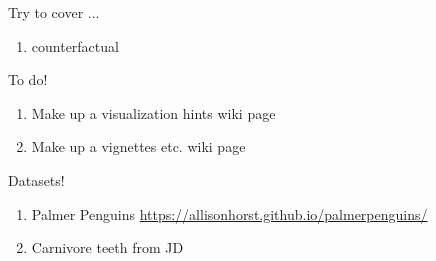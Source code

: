 \documentclass[11pt]{article}
\begin{document}

\renewcommand{\refname}{\CHead{}}

Try to cover ...
\begin{enumerate}
\item counterfactual
\end{enumerate}

To do!
\begin{enumerate}
\item Make up a visualization hints wiki page
\item Make up a vignettes etc. wiki page
\end{enumerate}


Datasets!
\begin{enumerate}
\item Palmer Penguins \url{https://allisonhorst.github.io/palmerpenguins/}
\item Carnivore teeth from JD 
\end{enumerate}
\end{document}
